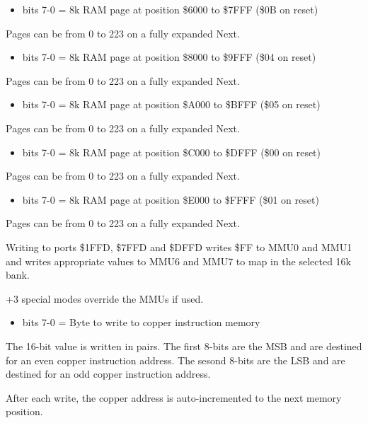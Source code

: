 \begin{itemize}
\item bits 7-0 = 8k RAM page at position \$6000 to \$7FFF (\$0B on
  reset)
\end{itemize}
Pages can be from 0 to 223 on a fully expanded Next.

\begin{itemize}
\item bits 7-0 = 8k RAM page at position \$8000 to \$9FFF (\$04 on
  reset)
\end{itemize}
Pages can be from 0 to 223 on a fully expanded Next.

\begin{itemize}
\item bits 7-0 = 8k RAM page at position \$A000 to \$BFFF (\$05 on
  reset)
\end{itemize}
Pages can be from 0 to 223 on a fully expanded Next.

\begin{itemize}
\item bits 7-0 = 8k RAM page at position \$C000 to \$DFFF (\$00 on
  reset)
\end{itemize}
Pages can be from 0 to 223 on a fully expanded Next.

\begin{itemize}
\item bits 7-0 = 8k RAM page at position \$E000 to \$FFFF (\$01 on
  reset)
\end{itemize}
Pages can be from 0 to 223 on a fully expanded Next.

Writing to ports \$1FFD, \$7FFD and \$DFFD writes \$FF to MMU0 and
MMU1 and writes appropriate values to MMU6 and MMU7 to map in the
selected 16k bank.

+3 special modes override the MMUs if used.

\begin{itemize}
\item bits 7-0 = Byte to write to copper instruction memory
\end{itemize}
The 16-bit value is written in pairs. The first 8-bits are the MSB and
are destined for an even copper instruction address. The sesond 8-bits
are the LSB and are destined for an odd copper instruction address.

After each write, the copper address is auto-incremented to the next
memory position.

